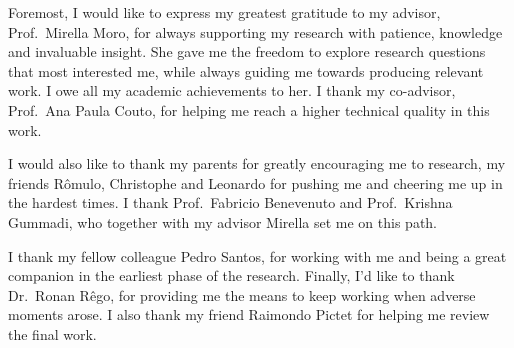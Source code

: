Foremost, I would like to express my greatest gratitude to my advisor,
Prof.~Mirella Moro, for always supporting my research with patience, knowledge
and invaluable insight. She gave me the freedom to explore research questions
that most interested me, while always guiding me towards producing relevant
work. I owe all my academic achievements to her. I thank my co-advisor,
Prof.~Ana Paula Couto, for helping me reach a higher technical quality in this
work.

I would also like to thank my parents for greatly encouraging me to research,
my friends Rômulo, Christophe and Leonardo for pushing me and cheering me up in
the hardest times. I thank Prof.~Fabricio Benevenuto and Prof.~Krishna Gummadi,
who together with my advisor Mirella set me on this path.

I thank my fellow colleague Pedro Santos, for working with me and being a great
companion in the earliest phase of the research. Finally, I'd like to thank
Dr.~Ronan Rêgo, for providing me the means to keep working when adverse moments
arose. I also thank my friend Raimondo Pictet for helping me review the final
work.
